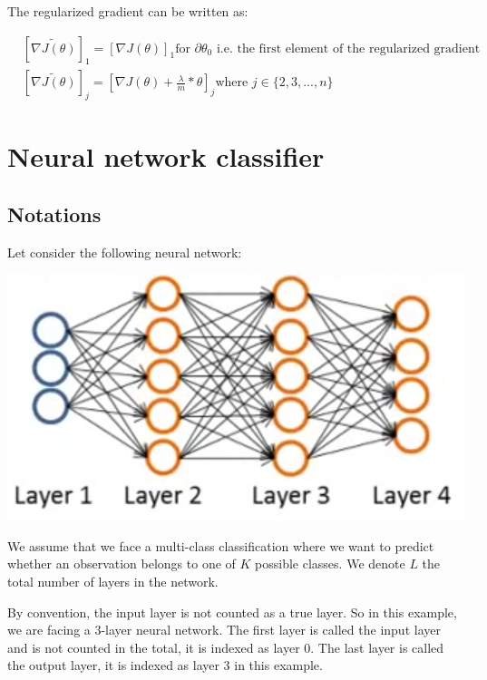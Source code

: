 \documentclass[a4paper, 12pt]{article}
\begin{document}
The regularized gradient can be written as:

\begin{align*}
& {\left [ \widetilde{\nabla J(\theta)} \right]}_{1} = {\left [ \nabla J(\theta) \right]}_{1} \text{for } \partial \theta_{0} \text{ i.e. the first element of the regularized gradient} \\
& {\left [ \widetilde{\nabla J(\theta)} \right]}_{j} = {\left [ \nabla J(\theta) + \frac{\lambda}{m}*\theta \right]}_{j} \text{where } j \in \{2, 3, ..., n\}
\end{align*}

\section{Neural network classifier}
\subsection{Notations}

Let consider the following neural network:

\begin{center}
  \includegraphics{neural}
  \label{fig:neural}
\end{center}

We assume that we face a multi-class classification where we want to predict whether an observation belongs to one of $K$ possible classes. We denote $L$ the total number of layers in the network.

By convention, the input layer is not counted as a true layer. So in this example, we are facing a 3-layer neural network. The first layer is called the input layer and is not counted in the total, it is indexed as layer 0. The last layer is called the output layer, it is indexed as layer 3 in this example.
\end{document}
